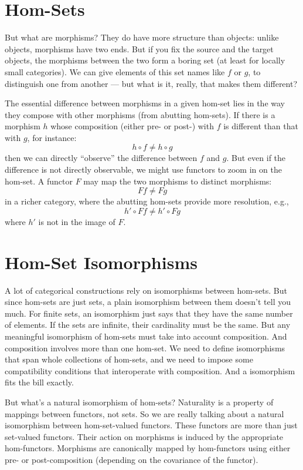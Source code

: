 \section{Hom-Sets}

But what are morphisms? They do have more structure than objects: unlike
objects, morphisms have two ends. But if you fix the source and the
target objects, the morphisms between the two form a boring set (at
least for locally small categories). We can give elements of this set
names like $f$ or $g$, to distinguish one from another ---
but what is it, really, that makes them different?

The essential difference between morphisms in a given hom-set lies in
the way they compose with other morphisms (from abutting hom-sets). If
there is a morphism $h$ whose composition (either pre- or post-)
with $f$ is different than that with $g$, for instance:
\[h \circ f \neq h \circ g\]
then we can directly ``observe'' the difference between $f$ and
$g$. But even if the difference is not directly observable, we
might use functors to zoom in on the hom-set. A functor $F$ may
map the two morphisms to distinct morphisms:
\[F f \neq F g\]
in a richer category, where the abutting hom-sets provide more
resolution, e.g.,
\[h' \circ F f \neq h' \circ F g\]
where $h'$ is not in the image of $F$.

\section{Hom-Set Isomorphisms}

A lot of categorical constructions rely on isomorphisms between
hom-sets. But since hom-sets are just sets, a plain isomorphism between
them doesn't tell you much. For finite sets, an isomorphism just says
that they have the same number of elements. If the sets are infinite,
their cardinality must be the same. But any meaningful isomorphism of
hom-sets must take into account composition. And composition involves
more than one hom-set. We need to define isomorphisms that span whole
collections of hom-sets, and we need to impose some compatibility
conditions that interoperate with composition. And a 
isomorphism fits the bill exactly.

But what's a natural isomorphism of hom-sets? Naturality is a property
of mappings between functors, not sets. So we are really talking about a
natural isomorphism between hom-set-valued functors. These functors are
more than just set-valued functors. Their action on morphisms is induced
by the appropriate hom-functors. Morphisms are canonically mapped by
hom-functors using either pre- or post-composition (depending on the
covariance of the functor).


